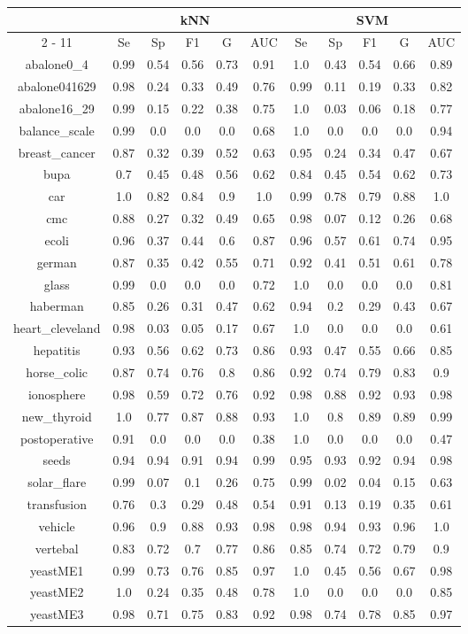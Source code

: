 \documentclass{article}%
\begin{document}
\begin{tabular}{|c|c|c|c|c|c|c|c|c|c|c|}%
\hline%
&\multicolumn{5}{|c|}{kNN}&\multicolumn{5}{|c|}{SVM}\\%
\cline{2%
-%
11}%
&Se&Sp&F1&G&AUC&Se&Sp&F1&G&AUC\\%
\hline%
abalone0\_4&0.99&0.54&0.56&0.73&0.91&1.0&0.43&0.54&0.66&0.89\\%
abalone041629&0.98&0.24&0.33&0.49&0.76&0.99&0.11&0.19&0.33&0.82\\%
abalone16\_29&0.99&0.15&0.22&0.38&0.75&1.0&0.03&0.06&0.18&0.77\\%
balance\_scale&0.99&0.0&0.0&0.0&0.68&1.0&0.0&0.0&0.0&0.94\\%
breast\_cancer&0.87&0.32&0.39&0.52&0.63&0.95&0.24&0.34&0.47&0.67\\%
bupa&0.7&0.45&0.48&0.56&0.62&0.84&0.45&0.54&0.62&0.73\\%
car&1.0&0.82&0.84&0.9&1.0&0.99&0.78&0.79&0.88&1.0\\%
cmc&0.88&0.27&0.32&0.49&0.65&0.98&0.07&0.12&0.26&0.68\\%
ecoli&0.96&0.37&0.44&0.6&0.87&0.96&0.57&0.61&0.74&0.95\\%
german&0.87&0.35&0.42&0.55&0.71&0.92&0.41&0.51&0.61&0.78\\%
glass&0.99&0.0&0.0&0.0&0.72&1.0&0.0&0.0&0.0&0.81\\%
haberman&0.85&0.26&0.31&0.47&0.62&0.94&0.2&0.29&0.43&0.67\\%
heart\_cleveland&0.98&0.03&0.05&0.17&0.67&1.0&0.0&0.0&0.0&0.61\\%
hepatitis&0.93&0.56&0.62&0.73&0.86&0.93&0.47&0.55&0.66&0.85\\%
horse\_colic&0.87&0.74&0.76&0.8&0.86&0.92&0.74&0.79&0.83&0.9\\%
ionosphere&0.98&0.59&0.72&0.76&0.92&0.98&0.88&0.92&0.93&0.98\\%
new\_thyroid&1.0&0.77&0.87&0.88&0.93&1.0&0.8&0.89&0.89&0.99\\%
postoperative&0.91&0.0&0.0&0.0&0.38&1.0&0.0&0.0&0.0&0.47\\%
seeds&0.94&0.94&0.91&0.94&0.99&0.95&0.93&0.92&0.94&0.98\\%
solar\_flare&0.99&0.07&0.1&0.26&0.75&0.99&0.02&0.04&0.15&0.63\\%
transfusion&0.76&0.3&0.29&0.48&0.54&0.91&0.13&0.19&0.35&0.61\\%
vehicle&0.96&0.9&0.88&0.93&0.98&0.98&0.94&0.93&0.96&1.0\\%
vertebal&0.83&0.72&0.7&0.77&0.86&0.85&0.74&0.72&0.79&0.9\\%
yeastME1&0.99&0.73&0.76&0.85&0.97&1.0&0.45&0.56&0.67&0.98\\%
yeastME2&1.0&0.24&0.35&0.48&0.78&1.0&0.0&0.0&0.0&0.85\\%
yeastME3&0.98&0.71&0.75&0.83&0.92&0.98&0.74&0.78&0.85&0.97\\%
\hline%
\end{tabular}
\end{document}
